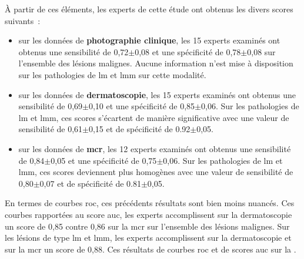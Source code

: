 À partir de ces éléments, les experts de cette étude ont obtenus les divers scores suivants~:
\begin{itemize}
    \item sur les données de \textbf{photographie clinique}, les 15 experts examinés ont obtenus une sensibilité de 0,72$\pm$0,08 et une spécificité de 0,78$\pm$0,08 sur l'ensemble des lésions malignes. Aucune information n'est mise à disposition sur les pathologies de \gls{lm} et \gls{lmm} sur cette modalité.
    \item sur les données de \textbf{dermatoscopie}, les 15 experts examinés ont obtenus une sensibilité de 0,69$\pm$0,10 et une spécificité de 0,85$\pm$0,06. Sur les pathologies de \gls{lm} et \gls{lmm}, ces scores s'écartent de manière significative avec une valeur de sensibilité de 0,61$\pm$0,15 et de spécificité de 0.92$\pm$0,05.
    \item sur les données de \textbf{\gls{mcr}}, les 12 experts examinés ont obtenus une sensibilité de 0,84$\pm$0,05 et une spécificité de 0,75$\pm$0,06. Sur les pathologies de \gls{lm} et \gls{lmm}, ces scores deviennent plus homogènes avec une valeur de sensibilité de 0,80$\pm$0,07 et de spécificité de 0.81$\pm$0,05.
\end{itemize}\par

En termes de courbes \gls{roc}, ces précédents résultats sont bien moins nuancés. Ces courbes rapportées au score \gls{auc}, les experts accomplissent sur la dermatoscopie un score de 0,85 contre 0,86 sur la \gls{mcr} sur l'ensemble des lésions malignes. Sur les lésions de type \gls{lm} et \gls{lmm}, les experts accomplissent sur la dermatoscopie et sur la \gls{mcr} un score de 0,88. Ces résultats de courbes \gls{roc} et de scores \gls{auc} sur la .\par

